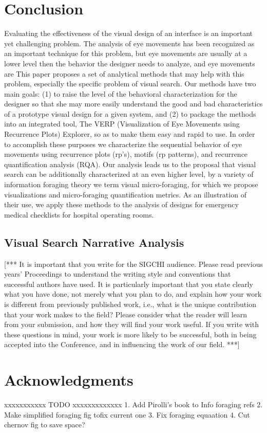 \documentclass{sigchi}
\begin{document}
\section{Conclusion} 
Evaluating the effectiveness of the visual design of an
interface is an important yet challenging problem. The analysis of eye movements has been recognized as an important technique for this problem, but eye movements are usually at a lower level then the behavior the designer needs to analyze, and eye movements are
This paper proposes a set
of analytical methods that may help with this problem, especially the
specific problem of visual search. Our methods have two main goals: (1) to
raise the level of the behavioral characterization for the designer so that
she may more easily understand the good and bad characteristics of a
prototype visual design for a given system, and (2) to package the methods
into an integrated tool, The VERP (Visualization of Eye Movements using
Recurrence Plots) Explorer, so as to make them easy and rapid to use. In
order to accomplish these purposes we characterize the sequential behavior of
eye movements using recurrence plots (rp's), 
motifs (rp patterns), and recurrence quantification analysis (RQA). Our analysis leads us to
the proposal that visual search can be additionally characterized at an even
higher level, by a variety of information foraging theory we term visual
micro-foraging, for which we propose visualizations and micro-foraging
quantification metrics. As an illustration of their use, we apply these
methods to the analysis of designs for emergency medical checklists for
hospital operating rooms.


\subsection{Visual Search Narrative Analysis}


[***  It is important that you write for the SIGCHI audience.  Please read
previous years' Proceedings to understand the writing style and conventions
that successful authors have used.  It is particularly important that you
state clearly what you have done, not merely what you plan to do, and
explain how your work is different from previously published work, i.e.,
what is the unique contribution that your work makes to the field?  Please
consider what the reader will learn from your submission, and how they will
find your work useful.  If you write with these questions in mind, your
work is more likely to be successful, both in being accepted into the
Conference, and in influencing the work of our field. ***]

\section{Acknowledgments}

xxxxxxxxxxx TODO xxxxxxxxxxxxx
1. Add Pirolli's book to Info foraging refs
2. Make simplified foraging fig tofix current one
3. Fix foraging equaation
4. Cut chernov fig to save space?


\pagebreak

 

 
\end{document}

